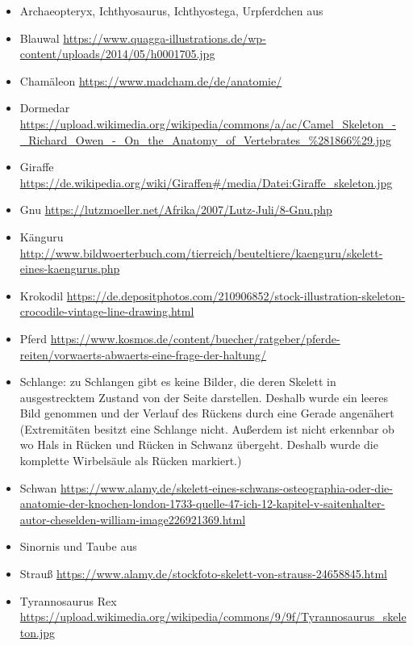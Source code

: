  \begin{itemize}
  \item Archaeopteryx, Ichthyosaurus, Ichthyostega, Urpferdchen aus \cite{Zoologie24Wehner}
  \item Blauwal \url{https://www.quagga-illustrations.de/wp-content/uploads/2014/05/h0001705.jpg}
  \item Chamäleon \url{https://www.madcham.de/de/anatomie/}
  \item Dormedar \url{https://upload.wikimedia.org/wikipedia/commons/a/ac/Camel_Skeleton_-_Richard_Owen_-_On_the_Anatomy_of_Vertebrates_\%281866\%29.jpg}
  \item Giraffe\\ \url{https://de.wikipedia.org/wiki/Giraffen#/media/Datei:Giraffe_skeleton.jpg}
  \item Gnu \url{https://lutzmoeller.net/Afrika/2007/Lutz-Juli/8-Gnu.php}
  \item Känguru \url{http://www.bildwoerterbuch.com/tierreich/beuteltiere/kaenguru/skelett-eines-kaengurus.php}
  \item Krokodil \url{https://de.depositphotos.com/210906852/stock-illustration-skeleton-crocodile-vintage-line-drawing.html}
  \item Pferd \url{https://www.kosmos.de/content/buecher/ratgeber/pferde-reiten/vorwaerts-abwaerts-eine-frage-der-haltung/}
  \item Schlange: zu Schlangen gibt es keine Bilder, die deren Skelett in ausgestrecktem Zustand von der Seite darstellen. Deshalb wurde ein leeres Bild genommen und der Verlauf des Rückens durch eine Gerade angenähert (Extremitäten besitzt eine Schlange nicht. Außerdem ist nicht erkennbar ob \bzw wo Hals in Rücken und Rücken in Schwanz übergeht. Deshalb wurde die komplette Wirbelsäule als Rücken markiert.)
  \item Schwan \url{https://www.alamy.de/skelett-eines-schwans-osteographia-oder-die-anatomie-der-knochen-london-1733-quelle-47-ich-12-kapitel-v-saitenhalter-autor-cheselden-william-image226921369.html}
  \item Sinornis und Taube aus \cite{Vergleichende_Anatomie}
  \item Strauß \url{https://www.alamy.de/stockfoto-skelett-von-strauss-24658845.html}
  \item Tyrannosaurus Rex \url{https://upload.wikimedia.org/wikipedia/commons/9/9f/Tyrannosaurus_skeleton.jpg}
 \end{itemize}
 
